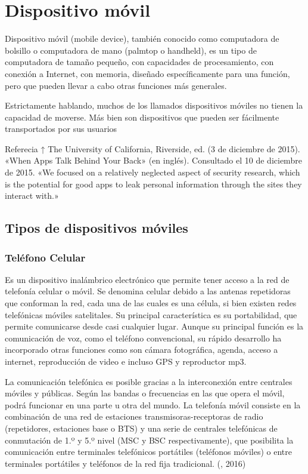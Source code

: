 \section{Dispositivo móvil}
\setlength{\parskip}{5mm}
Dispositivo móvil (mobile device), también conocido como computadora de bolsillo o computadora de mano (palmtop o handheld), es un tipo de computadora de tamaño pequeño, con capacidades de procesamiento, con conexión a Internet, con memoria, diseñado específicamente para una función, pero que pueden llevar a cabo otras funciones más generales.

Estrictamente hablando, muchos de los llamados dispositivos móviles no tienen la capacidad de moverse. Más bien son dispositivos que pueden ser fácilmente transportados por sus usuarios
\setlength{\parskip}{0mm}

Referecia
↑ The University of California, Riverside, ed. (3 de diciembre de 2015). «When Apps Talk Behind Your Back» (en inglés). Consultado el 10 de diciembre de 2015. «We focused on a relatively neglected aspect of security research, which is the potential for good apps to leak personal information through the sites they interact with.»

\subsection{Tipos de dispositivos móviles}

\subsubsection{Teléfono Celular} 
\setlength{\parskip}{5mm}
Es un dispositivo inalámbrico electrónico que permite tener acceso a la red de telefonía celular o móvil. Se denomina celular debido a las antenas repetidoras que conforman la red, cada una de las cuales es una célula, si bien existen redes telefónicas móviles satelitales. Su principal característica es su portabilidad, que permite comunicarse desde casi cualquier lugar. Aunque su principal función es la comunicación de voz, como el teléfono convencional, su rápido desarrollo ha incorporado otras funciones como son cámara fotográfica, agenda, acceso a internet, reproducción de video e incluso GPS y reproductor mp3.

La comunicación telefónica es posible gracias a la interconexión entre centrales móviles y públicas. Según las bandas o frecuencias en las que opera el móvil, podrá funcionar en una parte u otra del mundo. La telefonía móvil consiste en la combinación de una red de estaciones transmisoras-receptoras de radio (repetidores, estaciones base o BTS) y una serie de centrales telefónicas de conmutación de 1.º y 5.º nivel (MSC y BSC respectivamente), que posibilita la comunicación entre terminales telefónicos portátiles (teléfonos móviles) o entre terminales portátiles y teléfonos de la red fija tradicional.
\setlength{\parskip}{0mm}
(\citet{celbib}, 2016)

